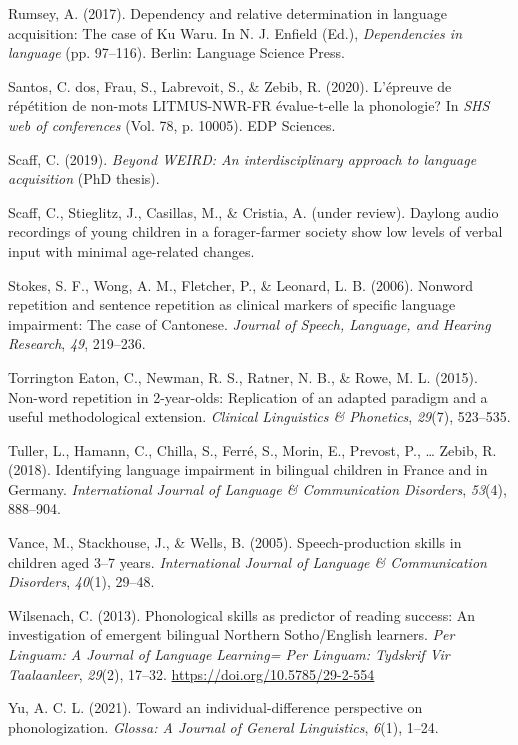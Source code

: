 \documentclass[
  american,
  ,man,floatsintext]{apa6}
\newlength{\cslhangindent}
\newlength{\cslentryspacingunit} %
\newenvironment{CSLReferences}[2] %
 {%
  \setlength{\parindent}{0pt}
  \ifodd #1
  \let\oldpar\par
  \def\par{\hangindent=\cslhangindent\oldpar}
  \fi
  \setlength{\parskip}{#2\cslentryspacingunit}
 }%
 {}
\begin{document}
\begin{CSLReferences}{1}{0}
\leavevmode{}%
Rumsey, A. (2017). Dependency and relative determination in language acquisition: The case of {Ku Waru}. In N. J. Enfield (Ed.), \emph{Dependencies in language} (pp. 97--116). Berlin: Language Science Press.

\leavevmode{}%
Santos, C. dos, Frau, S., Labrevoit, S., \& Zebib, R. (2020). L'{é}preuve de r{é}p{é}tition de non-mots LITMUS-NWR-FR {é}value-t-elle la phonologie? In \emph{SHS web of conferences} (Vol. 78, p. 10005). EDP Sciences.

\leavevmode{}%
Scaff, C. (2019). \emph{Beyond {WEIRD}: An interdisciplinary approach to language acquisition} (PhD thesis).

\leavevmode{}%
Scaff, C., Stieglitz, J., Casillas, M., \& Cristia, A. (under review). Daylong audio recordings of young children in a forager-farmer society show low levels of verbal input with minimal age-related changes.

\leavevmode{}%
Stokes, S. F., Wong, A. M., Fletcher, P., \& Leonard, L. B. (2006). Nonword repetition and sentence repetition as clinical markers of specific language impairment: The case of {C}antonese. \emph{Journal of Speech, Language, and Hearing Research}, \emph{49}, 219--236.

\leavevmode{}%
Torrington Eaton, C., Newman, R. S., Ratner, N. B., \& Rowe, M. L. (2015). Non-word repetition in 2-year-olds: Replication of an adapted paradigm and a useful methodological extension. \emph{Clinical Linguistics \& Phonetics}, \emph{29}(7), 523--535.

\leavevmode{}%
Tuller, L., Hamann, C., Chilla, S., Ferré, S., Morin, E., Prevost, P., \ldots{} Zebib, R. (2018). Identifying language impairment in bilingual children in {France and in Germany}. \emph{International Journal of Language \& Communication Disorders}, \emph{53}(4), 888--904.

\leavevmode{}%
Vance, M., Stackhouse, J., \& Wells, B. (2005). Speech-production skills in children aged 3--7 years. \emph{International Journal of Language \& Communication Disorders}, \emph{40}(1), 29--48.

\leavevmode{}%
Wilsenach, C. (2013). {Phonological skills as predictor of reading success: An investigation of emergent bilingual Northern Sotho/English learners}. \emph{{Per Linguam: A Journal of Language Learning= Per Linguam: Tydskrif Vir Taalaanleer}}, \emph{29}(2), 17--32. \url{https://doi.org/10.5785/29-2-554}

\leavevmode{}%
Yu, A. C. L. (2021). Toward an individual-difference perspective on phonologization. \emph{Glossa: A Journal of General Linguistics}, \emph{6}(1), 1--24.

\end{CSLReferences}
\end{document}
